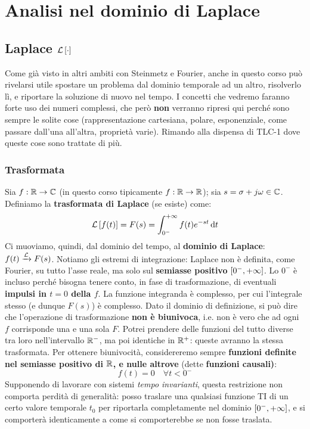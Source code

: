 
\part{Analisi nel dominio di Laplace}

\chapter{Laplace $\mathcal{L}\left[ \cdot \right]$}
Come già visto in altri ambiti con Steinmetz e Fourier, anche in questo corso può rivelarsi utile spostare un problema dal dominio temporale ad un altro, risolverlo lì, e riportare la soluzione di nuovo nel tempo.
I concetti che vedremo faranno forte uso dei numeri complessi, che però \textbf{non} verranno ripresi qui perché sono sempre le solite cose (rappresentazione cartesiana, polare, esponenziale, come passare dall'una all'altra, proprietà varie). Rimando alla dispensa di TLC-1 dove queste cose sono trattate di più.
\section{Trasformata}
\begin{defin}{}{}
Sia $f: \mathbb{R} \rightarrow \mathbb{C}$ (in questo corso tipicamente $f: \mathbb{R} \rightarrow \mathbb{R}$); sia $s = \sigma + j\omega \in \mathbb{C}$. Definiamo la \textbf{trasformata di Laplace} (se esiste) come:
\begin{equation}
	\mathcal{L}\left[ f(t) \right] = F(s) = \int_{0^-}^{+\infty} f(t) e^{-st} \dd{t}
\end{equation} 
Ci muoviamo, quindi, dal dominio del tempo, al \textbf{dominio di Laplace}: $f(t) \xrightarrow{\mathcal{L}} F(s)$. Notiamo gli estremi di integrazione: Laplace non è definita, come Fourier, su tutto l'asse reale, ma solo sul \textbf{semiasse positivo} $[0^-, +\infty]$. Lo $0^-$ è incluso perché bisogna tenere conto, in fase di trasformazione, di eventuali \textbf{impulsi in $t = 0$ della $f$}. La funzione integranda è complesso, per cui l'integrale stesso (e dunque $F(s)$) è complesso. \bb Dato il dominio di definizione, si può dire che l'operazione di trasformazione \textbf{non è biunivoca}, i.e. non è vero che ad ogni $f$ corrisponde una e una sola $F$. Potrei prendere delle funzioni del tutto diverse tra loro nell'intervallo $\mathbb{R}^-$, ma poi identiche in $\mathbb{R}^+$: queste avranno la stessa trasformata. Per ottenere biunivocità, considereremo  sempre \textbf{funzioni definite nel semiasse positivo di $\mathbb{R}$, e nulle altrove} (dette \textbf{funzioni causali)}:
\begin{equation}
	f(t) = 0 \quad \forall t < 0^-
\end{equation}
Supponendo di lavorare con sistemi \textit{tempo invarianti}, questa restrizione non comporta perdità di generalità: posso traslare una qualsiasi funzione TI di un certo valore temporale $t_0$ per riportarla completamente nel dominio $[0^-, +\infty]$, e si comporterà identicamente a come si comporterebbe se non fosse traslata. 
\end{defin}

